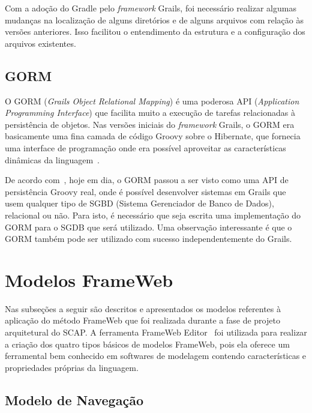Com a adoção do Gradle pelo \textit{framework} Grails, foi necessário realizar algumas mudanças na localização de alguns diretórios e de alguns arquivos com relação às versões anteriores. Isso facilitou o entendimento da estrutura e a configuração dos arquivos existentes.

\subsection{GORM}
\label{sec-projeto-gorm}

O GORM (\textit{Grails Object Relational Mapping}) é uma poderosa API (\textit{Application Programming Interface}) que facilita muito a execução de tarefas relacionadas à persistência de objetos. Nas versões iniciais do \textit{framework} Grails, o GORM era basicamente uma fina camada de código Groovy sobre o Hibernate, que fornecia uma interface de programação onde era possível aproveitar as características dinâmicas da linguagem~\cite{weissmann:fgapdw15}.

De acordo com~, hoje em dia, o GORM passou a ser visto como uma API de persistência Groovy real, onde é possível desenvolver sistemas em Grails que usem qualquer tipo de SGBD (Sistema Gerenciador de Banco de Dados), relacional ou não. Para isto, é necessário que seja escrita uma implementação do GORM para o SGDB que será utilizado. Uma observação interessante é que o GORM também pode ser utilizado com sucesso independentemente do Grails.  

\section{Modelos FrameWeb}
\label{sec-projeto-modelos-frameweb}

Nas subseções a seguir são descritos e apresentados os modelos referentes à aplicação do método FrameWeb que foi realizada durante a fase de projeto arquitetural do SCAP. A ferramenta FrameWeb Editor~\cite{campos-souza:webmedia17} foi utilizada para realizar a criação dos quatro tipos básicos de modelos FrameWeb, pois ela oferece um ferramental bem conhecido em softwares de modelagem contendo características e propriedades próprias da linguagem.  

\subsection{Modelo de Navegação}
\label{sec-projeto-modelo-navegacao}

